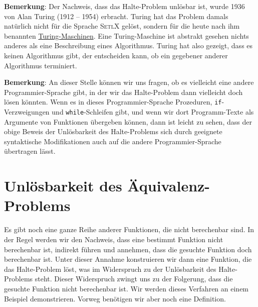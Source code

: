 \noindent
\textbf{Bemerkung}:
Der Nachweis, dass das Halte-Problem unlösbar ist, wurde 1936 von Alan Turing (1912 -- 1954)
\cite{turing:36} erbracht.  Turing hat das Problem damals natürlich nicht für die Sprache
\textsc{SetlX} gelöst, sondern für die heute nach ihm benannten
\href{https://de.wikipedia.org/wiki/Turingmaschine}{Turing-Maschinen}.   
Eine Turing-Maschine ist abstrakt gesehen nichts anderes als eine Beschreibung eines
Algorithmus.  Turing hat also gezeigt, dass es keinen Algorithmus gibt, der entscheiden
kann, ob ein gegebener anderer Algorithmus terminiert.
\vspace*{0.3cm}

\noindent
\textbf{Bemerkung}:
An dieser Stelle können wir uns fragen, ob es vielleicht eine andere Programmier-Sprache
gibt, in der wir das Halte-Problem dann vielleicht doch lösen könnten.  
Wenn es in dieses Programmier-Sprache Prozeduren, \texttt{if}-Verzweigungen und
\texttt{while}-Schleifen gibt, und wenn wir dort 
Programm-Texte als Argumente von Funktionen übergeben können, dann ist leicht zu sehen,
dass der obige Beweis der 
Unlösbarkeit des Halte-Problems sich durch geeignete syntaktische Modifikationen auch auf
die andere Programmier-Sprache übertragen lässt.


\section{Unlösbarkeit des Äquivalenz-Problems}
Es gibt noch eine ganze Reihe anderer Funktionen, die nicht berechenbar sind.  In der
Regel werden wir den Nachweis, dass eine bestimmt Funktion nicht berechenbar ist, indirekt führen
und annehmen, dass die gesuchte Funktion doch berechenbar ist.  Unter dieser Annahme
konstruieren wir dann eine Funktion, die das Halte-Problem löst, was im Widerspruch zu der Unlösbarkeit
des Halte-Problems steht.
Dieser Widerspruch zwingt uns zu der Folgerung, dass die gesuchte Funktion nicht berechenbar ist.
Wir werden dieses Verfahren an einem Beispiel demonstrieren.  Vorweg benötigen wir aber
noch eine Definition.

